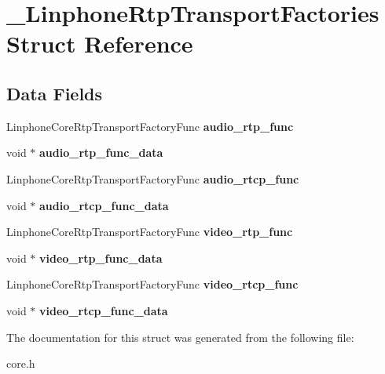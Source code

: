 \section{\+\_\+\+Linphone\+Rtp\+Transport\+Factories Struct Reference}
\label{struct__LinphoneRtpTransportFactories}
\subsection*{Data Fields}
\begin{DoxyCompactItemize}
\item 
\mbox{\label{struct__LinphoneRtpTransportFactories_a89d7ac5c81813d3b8c50c24541a0ba81}} 
Linphone\+Core\+Rtp\+Transport\+Factory\+Func {\bfseries audio\+\_\+rtp\+\_\+func}
\item 
\mbox{\label{struct__LinphoneRtpTransportFactories_a14ccf509d6344dc7f480783acf58deb0}} 
void $\ast$ {\bfseries audio\+\_\+rtp\+\_\+func\+\_\+data}
\item 
\mbox{\label{struct__LinphoneRtpTransportFactories_a3e237f48b9b3702811a34bd90e6e3b0d}} 
Linphone\+Core\+Rtp\+Transport\+Factory\+Func {\bfseries audio\+\_\+rtcp\+\_\+func}
\item 
\mbox{\label{struct__LinphoneRtpTransportFactories_a2c887bbecea43aad69693a5b95abb0ca}} 
void $\ast$ {\bfseries audio\+\_\+rtcp\+\_\+func\+\_\+data}
\item 
\mbox{\label{struct__LinphoneRtpTransportFactories_ac605cb56b4109562410fc0b299679c53}} 
Linphone\+Core\+Rtp\+Transport\+Factory\+Func {\bfseries video\+\_\+rtp\+\_\+func}
\item 
\mbox{\label{struct__LinphoneRtpTransportFactories_ab8243adb43e1e6e75d83238229c36b96}} 
void $\ast$ {\bfseries video\+\_\+rtp\+\_\+func\+\_\+data}
\item 
\mbox{\label{struct__LinphoneRtpTransportFactories_ad8151be00cb5b2dcd83ea96da806320c}} 
Linphone\+Core\+Rtp\+Transport\+Factory\+Func {\bfseries video\+\_\+rtcp\+\_\+func}
\item 
\mbox{\label{struct__LinphoneRtpTransportFactories_a09ad31a32ddd57eacbcb683a02fcdfb0}} 
void $\ast$ {\bfseries video\+\_\+rtcp\+\_\+func\+\_\+data}
\end{DoxyCompactItemize}


The documentation for this struct was generated from the following file\+:\begin{DoxyCompactItemize}
\item 
core.\+h\end{DoxyCompactItemize}
